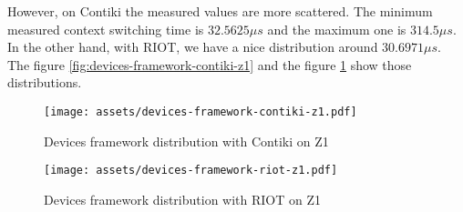 

However, on Contiki the measured values are more scattered.
The minimum measured context switching time is $32.5625\mu s$ and the maximum one is $314.5\mu s$.
In the other hand, with RIOT, we have a nice distribution around $30.6971\mu s$.
The figure \ref{fig:devices-framework-contiki-z1} and the figure \ref{fig:devices-framework-riot-z1} show those distributions.

\begin{figure}[!ht]
  \begin{minipage}{.45\textwidth}
      \centering
      \texttt{[image: assets/devices-framework-contiki-z1.pdf]}
      \caption{Devices framework distribution with Contiki on Z1\label{fig:devices-framework-contiki-z1}}
  \end{minipage}\hfill
  \begin{minipage}{.45\textwidth}        
      \centering
      \texttt{[image: assets/devices-framework-riot-z1.pdf]}
      \caption{Devices framework distribution with RIOT on Z1\label{fig:devices-framework-riot-z1}}
  \end{minipage}
\end{figure}




